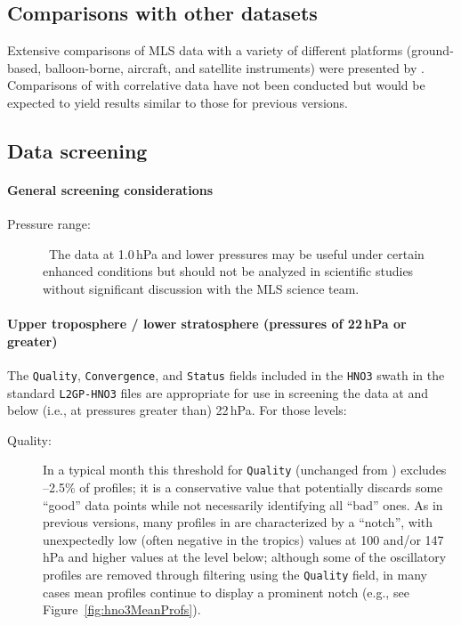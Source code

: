 \subsection{Comparisons with other datasets}

Extensive comparisons of MLS \vii {} data with a variety of different platforms (ground-based, balloon-borne, aircraft, and satellite instruments) were presented by \citet{SanteeEtal:2007:HNO3}. Comparisons of \thisv {} with correlative data have not been conducted but would be expected to yield results similar to those for previous versions.

\begin{nofloatpages}
\subsection{Data screening}
\label{sec:HNO3Screening}

\paragraph{General  screening considerations}
\begin{description}
  \item[Pressure range:] 

    \standardrangestatement\ The  data at 1.0\,hPa and lower pressures may be useful under certain enhanced conditions but should not be analyzed in scientific studies without significant discussion with the MLS science team.

    \standardprecisionrule

\end{description}
\paragraph{Upper troposphere / lower stratosphere
  (pressures of 22\,hPa or greater)}

The \texttt{Quality}, \texttt{Convergence}, and \texttt{Status} fields included in the \texttt{HNO3} swath in the standard \texttt{L2GP-HNO3} files are appropriate for use in screening the data at and below (i.e., at pressures greater than) 22\,hPa. For those levels:

\begin{description}
  \item[Quality:]  In a typical month this threshold for \texttt{Quality} (unchanged from \prevv) excludes --2.5\% of  profiles; it is a conservative value that potentially discards some ``good'' data points while not necessarily identifying all ``bad'' ones. As in previous versions, many  profiles in \thisv are characterized by a ``notch'', with unexpectedly low (often negative in the tropics) values at 100 and/or 147\,hPa and higher values at the level below; although some of the oscillatory profiles are removed through filtering using the \texttt{Quality} field, in many cases mean profiles continue to display a prominent notch (e.g., see Figure~\ref{fig:hno3MeanProfs}).


\end{description}
\end{nofloatpages}
